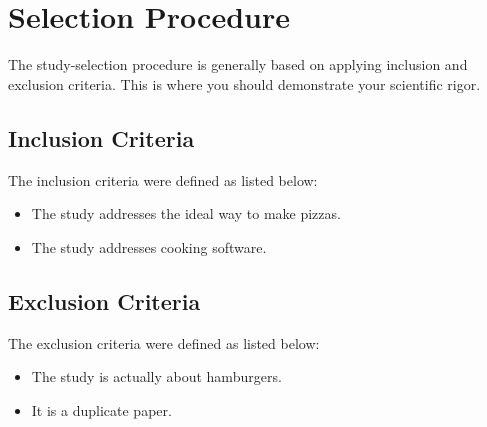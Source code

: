 \section{Selection Procedure}
\label{sub:selecao_pesquisa}

The study-selection procedure is generally based on applying inclusion and exclusion criteria. This is where you should demonstrate your scientific rigor.

\subsection{Inclusion Criteria}
\label{sub:criterios_inclusao}

The inclusion criteria were defined as listed below:

\begin{itemize}
    \item The study addresses the ideal way to make pizzas.
    \item The study addresses cooking software.
\end{itemize}

\subsection{Exclusion Criteria}
\label{sub:criterios_exclusao}

The exclusion criteria were defined as listed below:

\begin{itemize}
    \item The study is actually about hamburgers.
    \item It is a duplicate paper.
\end{itemize}


% 





